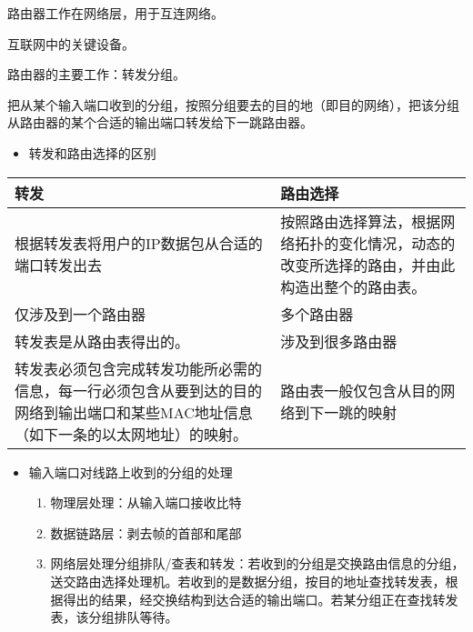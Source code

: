 \documentclass[11pt]{article}
\begin{document}
\begin{enumerate}
\begin{enumerate}
路由器工作在网络层，用于互连网络。

互联网中的关键设备。

路由器的主要工作：转发分组。

把从某个输入端口收到的分组，按照分组要去的目的地（即目的网络），把该分组从路由器的某个合适的输出端口转发给下一跳路由器。

\begin{itemize}
\item 转发和路由选择的区别
\end{itemize}
\begin{center}
\begin{tabular}{ll}
转发 & 路由选择\\
\hline
根据转发表将用户的IP数据包从合适的端口转发出去 & 按照路由选择算法，根据网络拓扑的变化情况，动态的改变所选择的路由，并由此构造出整个的路由表。\\
仅涉及到一个路由器 & 多个路由器\\
转发表是从路由表得出的。 & 涉及到很多路由器\\
转发表必须包含完成转发功能所必需的信息，每一行必须包含从要到达的目的网络到输出端口和某些MAC地址信息（如下一条的以太网地址）的映射。 & 路由表一般仅包含从目的网络到下一跳的映射\\
\end{tabular}
\end{center}

\begin{itemize}
\item 输入端口对线路上收到的分组的处理
\begin{enumerate}
\item 物理层处理：从输入端口接收比特
\item 数据链路层：剥去帧的首部和尾部
\item 网络层处理分组排队/查表和转发：若收到的分组是交换路由信息的分组，送交路由选择处理机。若收到的是数据分组，按目的地址查找转发表，根据得出的结果，经交换结构到达合适的输出端口。若某分组正在查找转发表，该分组排队等待。
\end{enumerate}


\end{itemize}
\end{enumerate}
\end{enumerate}
\end{document}
